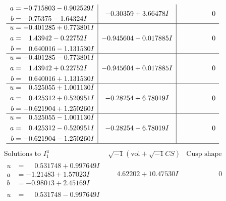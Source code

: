 \documentclass[1p]{elsarticle_modified}
\theoremstyle{definition}
\newcommand{\I}{\sqrt{-1}}
\begin{document}
$$\begin{array}{c|c|c}
\begin{aligned}
a &= -0.715803 - 0.902529 I \\
b &= -0.75375 - 1.64324 I\end{aligned}
 & -0.30359 + 3.66478 I & \phantom{-0.000000 } 0 \\ \hline\begin{aligned}
u &= -0.401285 + 0.773801 I \\
a &= \phantom{-}1.43942 - 0.22752 I \\
b &= \phantom{-}0.640016 - 1.131530 I\end{aligned}
 & -0.945604 - 0.017885 I & \phantom{-0.000000 } 0 \\ \hline\begin{aligned}
u &= -0.401285 - 0.773801 I \\
a &= \phantom{-}1.43942 + 0.22752 I \\
b &= \phantom{-}0.640016 + 1.131530 I\end{aligned}
 & -0.945604 + 0.017885 I & \phantom{-0.000000 } 0 \\ \hline\begin{aligned}
u &= \phantom{-}0.525055 + 1.001130 I \\
a &= \phantom{-}0.425312 + 0.520951 I \\
b &= -0.621904 + 1.250260 I\end{aligned}
 & -0.28254 + 6.78019 I & \phantom{-0.000000 } 0 \\ \hline\begin{aligned}
u &= \phantom{-}0.525055 - 1.001130 I \\
a &= \phantom{-}0.425312 - 0.520951 I \\
b &= -0.621904 - 1.250260 I\end{aligned}
 & -0.28254 - 6.78019 I & \phantom{-0.000000 } 0\\
 \hline 
 \end{array}$$\newpage$$\begin{array}{c|c|c}  
\text{Solutions to }I^u_{1}& \I (\text{vol} + \sqrt{-1}CS) & \text{Cusp shape}\\
 \hline 
\begin{aligned}
u &= \phantom{-}0.531748 + 0.997649 I \\
a &= -1.21483 + 1.57023 I \\
b &= -0.98013 + 2.45169 I\end{aligned}
 & \phantom{-}4.62202 + 10.47530 I & \phantom{-0.000000 } 0 \\ \hline\begin{aligned}
u &= \phantom{-}0.531748 - 0.997649 I \\

\end{aligned}
\end{array}$$
\end{document}
